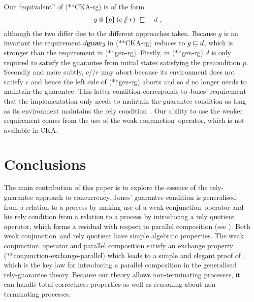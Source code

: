 \documentclass[fleqn]{fac}
\makeatletter
\def\refaxiom{\@ifnextchar*{\@refaxiom}{\@@refaxiom}}
\def\@refaxiom*#1{\ref{axiom-#1}\index{Axiom!#1|LawUse}}
\def\@@refaxiom#1{axiom~(\ref{axiom-#1})\index{Axiom!#1|LawUse}}
\newcommand{\labelproperty}[1]{\label{property-#1}\index{Property!#1|PropertyDef{\ref{property-#1}}}}
\def\refproperty{\@ifnextchar*{\@refproperty}{\@@refproperty}}
\def\@refproperty*#1{\ref{property-#1}\index{Property!#1|LawUse}}
\def\@@refproperty#1{property~(\ref{property-#1})\index{Property!#1|LawUse}}
\newcommand{\Pre}[1]{\{#1\}}
\newcommand{\SSeq}{\,}
\newcommand{\strictconjunction}{weak conjunction}
\newcommand{\together}{\mathbin{\doublecap}}
\newcommand{\quotient}{\mathbin{/\!\!/}}
\newcommand{\Keyword}[1]{\mathsf{\mathbf{#1}}}
\makeatother
\begin{document}
Our ``equivalent'' of (\refproperty*{CKA-rg}) is of the form
\begin{eqnarray}
  g \together \Pre{p} \SSeq (c \quotient r) & ~\refsto~ & d~,
    \labelproperty{gen-rg}
\end{eqnarray}
although the two differ due to the different approaches taken.
Because $g$ is an invariant 
the requirement $d \mathrel{\Keyword{guar}} g$ in (\refproperty*{CKA-rg}) reduces to $g \mathrel{\sqsubseteq} d$,
which is stronger than the requirement in (\refproperty*{gen-rg}). 
Firstly, in (\refproperty*{gen-rg}) $d$ is only required to satisfy the guarantee from initial states satisfying the precondition $p$.
Secondly and more subtly, $c \quotient r$ may abort 
because its environment does not satisfy $r$ and 
hence the left side of (\refproperty*{gen-rg}) aborts and so $d$ no longer needs to maintain the guarantee.
This latter condition corresponds to Jones' requirement that the implementation only needs to maintain
the guarantee condition as long as its environment maintains the rely condition~\cite{jon83a}.
Our ability to use the weaker requirement comes from the use of the \strictconjunction\ operator,
which is not available in CKA.



\section{Conclusions}\label{section:conclusions}

The main contribution of this paper is to explore the essence of the rely-guarantee approach to concurrency.
Jones' guarantee condition is generalised from a relation to a process 
by making use of a \strictconjunction\ operator
and his rely condition from a relation to a process by introducing a rely quotient operator,
which forms a residual with respect to parallel composition (see ).
Both \strictconjunction\ and rely quotient have simple algebraic properties.
The \strictconjunction\ operator and parallel composition satisfy an exchange property
(\refaxiom*{conjunction-exchange-parallel})
which leads to a simple and elegant proof of , 
which is the key law for introducing a parallel composition in the generalised rely-guarantee theory.
Because our theory allows non-terminating processes,
it can handle total correctness properties as well as reasoning about non-terminating processes.
\end{document}
